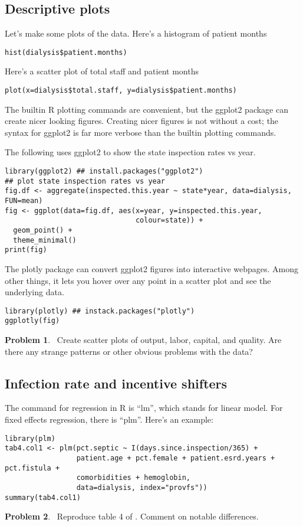 \documentclass[11pt,reqno,letter]{article}
\renewcommand{\cite}{\citet}
\theoremstyle{definition}
\theoremstyle{problem}
\newtheorem{prob}{Problem}
\newenvironment{problem} 
  {\begin{mdframed}\begin{prob}$\,$}
  {\end{prob}\end{mdframed}}
\begin{document}
\subsection{Descriptive plots}

Let's make some plots of the data. Here's a histogram of patient months
\begin{lstlisting}
hist(dialysis$patient.months)
\end{lstlisting}
Here's a scatter plot of total staff and patient months
\begin{lstlisting}
plot(x=dialysis$total.staff, y=dialysis$patient.months)
\end{lstlisting}
The builtin R plotting commands are convenient, but the ggplot2
package can create nicer looking figures. Creating nicer figures is
not without a cost; the syntax for ggplot2 is far more verbose than
the builtin plotting commands.

The following uses ggplot2 to show the state inspection rates vs year.
\begin{lstlisting}
library(ggplot2) ## install.packages("ggplot2") 
## plot state inspection rates vs year
fig.df <- aggregate(inspected.this.year ~ state*year, data=dialysis, FUN=mean)
fig <- ggplot(data=fig.df, aes(x=year, y=inspected.this.year,
                               colour=state)) +
  geom_point() +
  theme_minimal() 
print(fig)
\end{lstlisting}
The plotly package can convert ggplot2 figures into interactive
webpages. Among other things, it lets you hover over any point in a
scatter plot and see the underlying data. 
\begin{lstlisting}
library(plotly) ## instack.packages("plotly")
ggplotly(fig)
\end{lstlisting}

\begin{problem}
  Create scatter plots of output, labor, capital, and quality. 
  Are there any strange patterns or other obvious problems with the data?
\end{problem}

\subsection{Infection rate and incentive shifters}

The command for regression in R is ``lm'', which stands for linear
model. For fixed effects regression, there is ``plm''. Here's an
example:
\begin{lstlisting}
library(plm)
tab4.col1 <- plm(pct.septic ~ I(days.since.inspection/365) +
                 patient.age + pct.female + patient.esrd.years + pct.fistula +
                 comorbidities + hemoglobin,
                 data=dialysis, index="provfs")) 
summary(tab4.col1)
\end{lstlisting}
\begin{problem}
  Reproduce table 4 of \cite{grieco2017}. Comment on notable
  differences. 
\end{problem}
\end{document}
